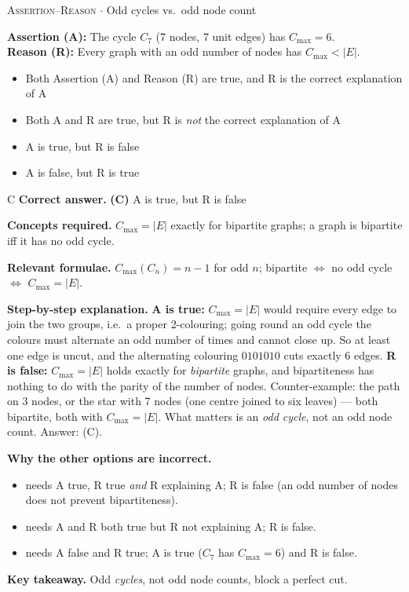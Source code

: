 \documentclass[11pt,a4paper]{article}
\newcommand{\optlabel}[1]{\textbf{(#1)}}
\newcommand{\correctlabel}[1]{\textcolor{okgreen}{\textbf{(#1)}\,\ding{51}}}
\newenvironment{qitem}[1]{\begin{list}{}{\setlength{\leftmargin}{3.3em}\setlength{\labelwidth}{3.1em}%
  \setlength{\labelsep}{0.2em}\setlength{\topsep}{3pt}\setlength{\parsep}{3pt}}\item[\textbf{Q.#1}\hfill]}{\end{list}}
\newcommand{\qsep}{\par\vspace{2pt}{\color{black!15}\hrule}\vspace{4pt}}
\newcommand{\qmeta}[2]{{\footnotesize\color{black!60}\textsc{#1} \;$\cdot$\; #2}\par}
\begin{document}
\begin{qitem}{7}
\qmeta{Assertion--Reason}{Odd cycles vs.\ odd node count}
\textbf{Assertion (A):} The cycle $C_7$ (7 nodes, 7 unit edges) has $C_{\max} = 6$.\\[1mm]
\textbf{Reason (R):} Every graph with an odd number of nodes has $C_{\max} < |E|$.
\begin{itemize}[leftmargin=2.6em, labelsep=0.4em, itemsep=2pt, topsep=3pt]
\item[\optlabel{A}] Both Assertion (A) and Reason (R) are true, and R is the correct explanation of A
\item[\optlabel{B}] Both A and R are true, but R is \emph{not} the correct explanation of A
\item[\correctlabel{C}] A is true, but R is false
\item[\optlabel{D}] A is false, but R is true
\end{itemize}
\end{qitem}
\begin{solbox}{C}
\textbf{\color{brand}Correct answer.} \textcolor{okgreen}{\textbf{(C)}} A is true, but R is false

\textbf{\color{brand}Concepts required.} $C_{\max} = |E|$ exactly for bipartite graphs; a graph is bipartite iff it has no odd cycle.

\textbf{\color{brand}Relevant formulae.} $C_{\max}(C_n) = n - 1$ for odd $n$; bipartite $\iff$ no odd cycle $\iff$ $C_{\max} = |E|$.

\textbf{\color{brand}Step-by-step explanation.} \textbf{A is true:} $C_{\max} = |E|$ would require every edge to join the two groups, i.e.\ a proper 2-colouring;
going round an odd cycle the colours must alternate an odd number of times and cannot close up. So at least one edge
is uncut, and the alternating colouring $0101010$ cuts exactly $6$ edges.
\textbf{R is false:} $C_{\max} = |E|$ holds exactly for \emph{bipartite} graphs, and bipartiteness has nothing to do with the
parity of the number of nodes. Counter-example: the path on 3 nodes, or the star with 7 nodes (one centre joined to six
leaves) --- both bipartite, both with $C_{\max} = |E|$. What matters is an \emph{odd cycle}, not an odd node count. Answer: (C).

\textbf{\color{brand}Why the other options are incorrect.}
\begin{itemize}[leftmargin=2.4em, itemsep=1pt, topsep=2pt]
\item[\textbf{(A)}] needs A true, R true \emph{and} R explaining A; R is false (an odd number of nodes does not prevent bipartiteness).
\item[\textbf{(B)}] needs A and R both true but R not explaining A; R is false.
\item[\textbf{(D)}] needs A false and R true; A is true ($C_7$ has $C_{\max} = 6$) and R is false.
\end{itemize}
\textbf{\color{brand}Key takeaway.} Odd \emph{cycles}, not odd node counts, block a perfect cut.
\end{solbox}
\qsep
\end{document}
